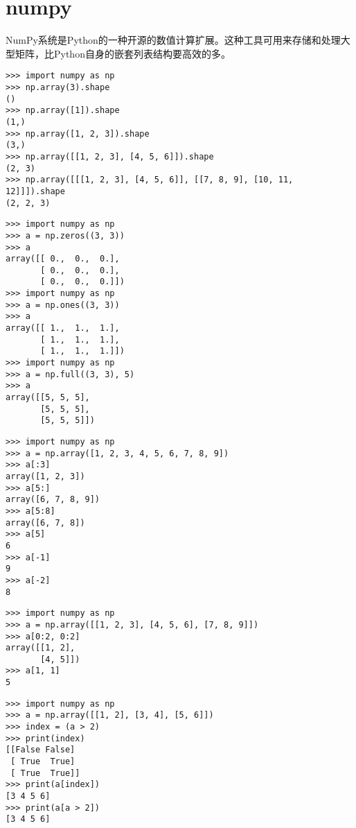\section{numpy}
NumPy系统是Python的一种开源的数值计算扩展。这种工具可用来存储和处理大型矩阵，比Python自身的嵌套列表结构要高效的多。

\begin{verbatim}
>>> import numpy as np
>>> np.array(3).shape
()
>>> np.array([1]).shape
(1,)
>>> np.array([1, 2, 3]).shape
(3,)
>>> np.array([[1, 2, 3], [4, 5, 6]]).shape
(2, 3)
>>> np.array([[[1, 2, 3], [4, 5, 6]], [[7, 8, 9], [10, 11, 12]]]).shape
(2, 2, 3)
\end{verbatim}

\begin{verbatim}
>>> import numpy as np
>>> a = np.zeros((3, 3))
>>> a
array([[ 0.,  0.,  0.],
       [ 0.,  0.,  0.],
       [ 0.,  0.,  0.]])
>>> import numpy as np
>>> a = np.ones((3, 3))
>>> a
array([[ 1.,  1.,  1.],
       [ 1.,  1.,  1.],
       [ 1.,  1.,  1.]])
>>> import numpy as np
>>> a = np.full((3, 3), 5)
>>> a
array([[5, 5, 5],
       [5, 5, 5],
       [5, 5, 5]])
\end{verbatim}


\begin{verbatim}
>>> import numpy as np
>>> a = np.array([1, 2, 3, 4, 5, 6, 7, 8, 9])
>>> a[:3]
array([1, 2, 3])
>>> a[5:]
array([6, 7, 8, 9])
>>> a[5:8]
array([6, 7, 8])
>>> a[5]
6
>>> a[-1]
9
>>> a[-2]
8
\end{verbatim}


\begin{verbatim}
>>> import numpy as np
>>> a = np.array([[1, 2, 3], [4, 5, 6], [7, 8, 9]])
>>> a[0:2, 0:2]
array([[1, 2],
       [4, 5]])
>>> a[1, 1]
5
\end{verbatim}


\begin{verbatim}
>>> import numpy as np
>>> a = np.array([[1, 2], [3, 4], [5, 6]])
>>> index = (a > 2)
>>> print(index)
[[False False]
 [ True  True]
 [ True  True]]
>>> print(a[index])
[3 4 5 6]
>>> print(a[a > 2])
[3 4 5 6]
\end{verbatim}


